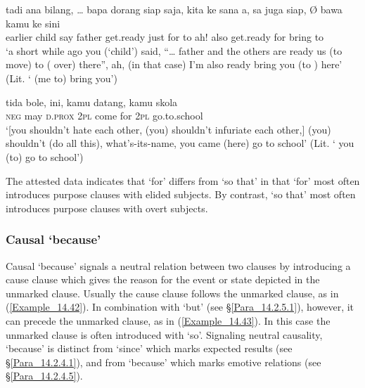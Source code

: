 \ea
\label{Example_14.40}
\gll       tadi  ana  bilang,  {\ldots}  bapa  dorang  siap  saja,    kita   ke  sana  a,  sa  juga  siap,    Ø  bawa  kamu   ke  sini\\  
earlier  child  say {}   father    get.ready  just  for     to    ah!    also  get.ready  for  {}  bring     to  \\
\glt ‘a short while ago you (‘child’) said, ``{\ldots} father and the others are ready  us (to move) to ( over) there'', ah, (in that case) I’m also ready  bring you (to ) here’ (Lit. ‘ (me to) bring you’) \textstyleExampleSource{[080922-001a-CvPh.1241]}
\z

\ea\label{Example_14.41}
\gll {\ldots} {tida} {bole,} {ini,} {kamu} {datang,} {} {kamu} {skola}\\ %
   {} \textsc{neg}  may  \textsc{d.prox}  \textsc{2pl}  come  for  \textsc{2pl}  go.to.school\\
\glt ‘[you shouldn’t hate each other, (you) shouldn’t infuriate each other,] (you) shouldn’t (do all this), what’s-its-name, you came (here)  go to school’ (Lit. ‘ you (to) go to school’) \textstyleExampleSource{[081115-001a-Cv.0272]}
\z


\noindent The attested data indicates that  ‘for’ differs from  ‘so that’ in that  ‘for’ most often introduces purpose clauses with elided subjects. By contrast,  ‘so that’ most often introduces purpose clauses with overt subjects.


\subsubsection[Causal karna ‘because’]{Causal  ‘because’}
\label{Para_14.2.4.4}
Causal  ‘because’ signals a neutral  relation between two clauses by introducing a cause clause which gives the reason for the event or state depicted in the unmarked clause. Usually the cause clause follows the unmarked clause, as in (\ref{Example_14.42}). In combination with   ‘but’ (see §\ref{Para_14.2.5.1}), however, it can precede the unmarked clause, as in (\ref{Example_14.43}). In this case the unmarked clause is often introduced with   ‘so’. Signaling neutral causality,  ‘because’ is distinct from   ‘since’ which marks expected results (see §\ref{Para_14.2.4.1}), and from   ‘because’ which marks emotive  relations (see §\ref{Para_14.2.4.5}).
%

